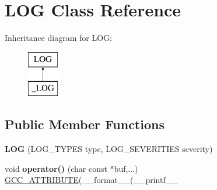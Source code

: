 \hypertarget{classLOG}{\section{L\-O\-G Class Reference}
\label{classLOG}
}
Inheritance diagram for L\-O\-G\-:\begin{figure}[H]
\begin{center}
\leavevmode
\includegraphics[height=2.000000cm]{classLOG}
\end{center}
\end{figure}
\subsection*{Public Member Functions}
\begin{DoxyCompactItemize}
\item 
\hypertarget{classLOG_a9e4ca0c6852f35edaa02ea890affc566}{{\bfseries L\-O\-G} (L\-O\-G\-\_\-\-T\-Y\-P\-E\-S type, L\-O\-G\-\_\-\-S\-E\-V\-E\-R\-I\-T\-I\-E\-S severity)}\label{classLOG_a9e4ca0c6852f35edaa02ea890affc566}

\item 
\hypertarget{classLOG_a2511c7332dcc271afa2a6422fc0516dd}{void {\bfseries operator()} (char const $\ast$buf,...) \hyperlink{structGCC__ATTRIBUTE}{G\-C\-C\-\_\-\-A\-T\-T\-R\-I\-B\-U\-T\-E}(\-\_\-\-\_\-format\-\_\-\-\_\-(\-\_\-\-\_\-printf\-\_\-\-\_\-}\label{classLOG_a2511c7332dcc271afa2a6422fc0516dd}

\end{DoxyCompactItemize}
